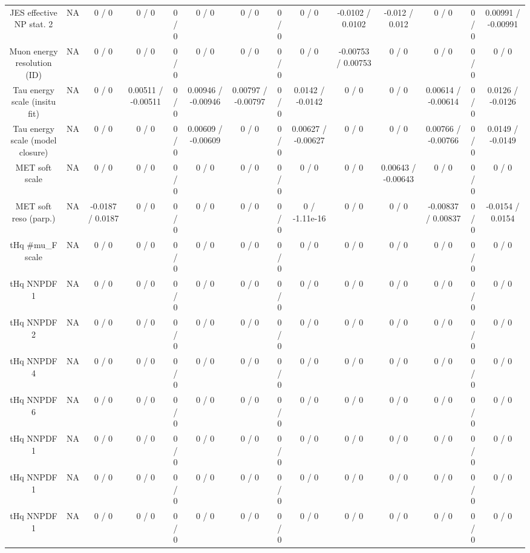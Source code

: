 \documentclass[10pt]{article}
\begin{document}
\begin{table}[htbp]
\begin{center}
\begin{tabular}{|c|c|c|c|c|c|c|c|c|c|c|c|c|c|}
  JES effective NP stat. 2 &    NA    & 0 / 0 & 0 / 0 & 0 / 0 & 0 / 0 & 0 / 0 & 0 / 0 & 0 / 0 & -0.0102 / 0.0102 & -0.012 / 0.012 & 0 / 0 & 0 / 0 & 0.00991 / -0.00991 \\ 
  Muon energy resolution (ID) &    NA    & 0 / 0 & 0 / 0 & 0 / 0 & 0 / 0 & 0 / 0 & 0 / 0 & 0 / 0 & -0.00753 / 0.00753 & 0 / 0 & 0 / 0 & 0 / 0 & 0 / 0 \\ 
  Tau energy scale (insitu fit) &    NA    & 0 / 0 & 0.00511 / -0.00511 & 0 / 0 & 0.00946 / -0.00946 & 0.00797 / -0.00797 & 0 / 0 & 0.0142 / -0.0142 & 0 / 0 & 0 / 0 & 0.00614 / -0.00614 & 0 / 0 & 0.0126 / -0.0126 \\ 
  Tau energy scale (model closure) &    NA    & 0 / 0 & 0 / 0 & 0 / 0 & 0.00609 / -0.00609 & 0 / 0 & 0 / 0 & 0.00627 / -0.00627 & 0 / 0 & 0 / 0 & 0.00766 / -0.00766 & 0 / 0 & 0.0149 / -0.0149 \\ 
  MET soft scale &    NA    & 0 / 0 & 0 / 0 & 0 / 0 & 0 / 0 & 0 / 0 & 0 / 0 & 0 / 0 & 0 / 0 & 0.00643 / -0.00643 & 0 / 0 & 0 / 0 & 0 / 0 \\ 
  MET soft reso (parp.) &    NA    & -0.0187 / 0.0187 & 0 / 0 & 0 / 0 & 0 / 0 & 0 / 0 & 0 / 0 & 0 / -1.11e-16 & 0 / 0 & 0 / 0 & -0.00837 / 0.00837 & 0 / 0 & -0.0154 / 0.0154 \\ 
  tHq #mu_{F} scale &    NA    & 0 / 0 & 0 / 0 & 0 / 0 & 0 / 0 & 0 / 0 & 0 / 0 & 0 / 0 & 0 / 0 & 0 / 0 & 0 / 0 & 0 / 0 & 0 / 0 \\ 
  tHq NNPDF 1 &    NA    & 0 / 0 & 0 / 0 & 0 / 0 & 0 / 0 & 0 / 0 & 0 / 0 & 0 / 0 & 0 / 0 & 0 / 0 & 0 / 0 & 0 / 0 & 0 / 0 \\ 
  tHq NNPDF 2 &    NA    & 0 / 0 & 0 / 0 & 0 / 0 & 0 / 0 & 0 / 0 & 0 / 0 & 0 / 0 & 0 / 0 & 0 / 0 & 0 / 0 & 0 / 0 & 0 / 0 \\ 
  tHq NNPDF 4 &    NA    & 0 / 0 & 0 / 0 & 0 / 0 & 0 / 0 & 0 / 0 & 0 / 0 & 0 / 0 & 0 / 0 & 0 / 0 & 0 / 0 & 0 / 0 & 0 / 0 \\ 
  tHq NNPDF 6 &    NA    & 0 / 0 & 0 / 0 & 0 / 0 & 0 / 0 & 0 / 0 & 0 / 0 & 0 / 0 & 0 / 0 & 0 / 0 & 0 / 0 & 0 / 0 & 0 / 0 \\ 
  tHq NNPDF 1 &    NA    & 0 / 0 & 0 / 0 & 0 / 0 & 0 / 0 & 0 / 0 & 0 / 0 & 0 / 0 & 0 / 0 & 0 / 0 & 0 / 0 & 0 / 0 & 0 / 0 \\ 
  tHq NNPDF 1 &    NA    & 0 / 0 & 0 / 0 & 0 / 0 & 0 / 0 & 0 / 0 & 0 / 0 & 0 / 0 & 0 / 0 & 0 / 0 & 0 / 0 & 0 / 0 & 0 / 0 \\ 
  tHq NNPDF 1 &    NA    & 0 / 0 & 0 / 0 & 0 / 0 & 0 / 0 & 0 / 0 & 0 / 0 & 0 / 0 & 0 / 0 & 0 / 0 & 0 / 0 & 0 / 0 & 0 / 0 \\ 

\end{tabular}
\end{center}
\end{table}
\end{document}
